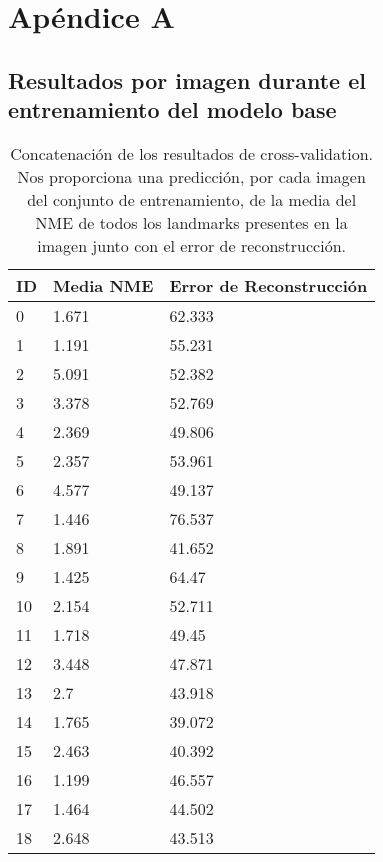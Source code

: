 
\chapter{Apéndice A}\label{ap:apendiceA}

\section{Resultados por imagen durante el entrenamiento del modelo base}

\begin{table}[!ht]
    \centering
    \caption{Concatenación de los resultados de cross-validation. Nos proporciona una predicción, por cada imagen del conjunto de entrenamiento, de la media del NME de todos los landmarks presentes en la imagen junto con el error de reconstrucción.}
    \begin{tabular}{|l|l|l|}
    \hline
        \cellcolor{gray!25}\textbf{ID} & \cellcolor{gray!25}\textbf{Media NME} & \cellcolor{gray!25}\textbf{Error de Reconstrucción} \\ \hline
        0 & 1.671 & 62.333 \\ \hline
        1 & 1.191 & 55.231 \\ \hline
        2 & 5.091 & 52.382 \\ \hline
        3 & 3.378 & 52.769 \\ \hline
        4 & 2.369 & 49.806 \\ \hline
        5 & 2.357 & 53.961 \\ \hline
        6 & 4.577 & 49.137 \\ \hline
        7 & 1.446 & 76.537 \\ \hline
        8 & 1.891 & 41.652 \\ \hline
        9 & 1.425 & 64.47 \\ \hline
        10 & 2.154 & 52.711 \\ \hline
        11 & 1.718 & 49.45 \\ \hline
        12 & 3.448 & 47.871 \\ \hline
        13 & 2.7 & 43.918 \\ \hline
        14 & 1.765 & 39.072 \\ \hline
        15 & 2.463 & 40.392 \\ \hline
        16 & 1.199 & 46.557 \\ \hline
        17 & 1.464 & 44.502 \\ \hline
        18 & 2.648 & 43.513 \\ \hline

\end{tabular}
\end{table}
